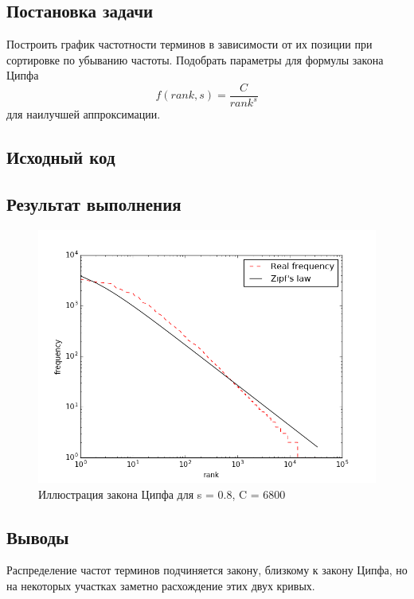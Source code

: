 \documentclass[a4paper, 12pt]{article}
\begin{document}

\newpage


\subsection*{Постановка задачи}
Построить график частотности терминов в зависимости от их позиции при сортировке по убыванию частоты. Подобрать параметры для формулы закона Ципфа
$$f(rank, s) = \dfrac{C}{{rank}^s}$$
для наилучшей аппроксимации.


\subsection*{Исходный код}



\subsection*{Результат выполнения}
\begin{figure}[!htb]
	\centering
	\includegraphics[scale=0.8]{zipf.png}
	\caption{Иллюстрация закона Ципфа для s = 0.8, C = 6800}
\end{figure}

\subsection*{Выводы}
Распределение частот терминов подчиняется закону, близкому к закону Ципфа, но на некоторых участках заметно расхождение этих двух кривых.
\end{document}
